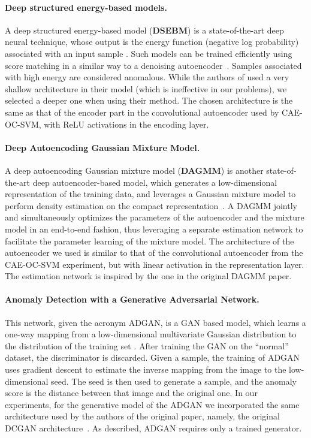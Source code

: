 \documentclass{article}
\begin{document}
	\paragraph{Deep structured energy-based models.} A deep structured energy-based model 
	(\textbf{DSEBM}) is a state-of-the-art 
	deep neural technique, whose output is the energy function	
	(negative log probability) associated with an input sample \cite{zhai2016deep}. 
	Such models can be trained efficiently using score matching in a similar way to a denoising autoencoder~\cite{vincent2011connection}. 
	Samples associated with high energy are considered anomalous. 
	While the authors of \cite{zhai2016deep} used a very shallow architecture in their model 
	(which is ineffective in our problems), we selected a deeper one when using their method. The chosen architecture is the same as that of the encoder part in the convolutional autoencoder used by CAE-OC-SVM, with ReLU activations in the encoding layer.
	
	\paragraph{Deep Autoencoding Gaussian Mixture Model.} 
	A deep autoencoding Gaussian mixture model (\textbf{DAGMM}) is another state-of-the-art deep autoencoder-based model, 
	which generates a low-dimensional representation of the training data, and leverages a Gaussian 
	mixture model to perform density estimation on the compact representation~\cite{zong2018deep}. A DAGMM jointly
	and simultaneously optimizes the parameters of the autoencoder and the mixture model 
	in an end-to-end fashion, thus leveraging a separate estimation network to facilitate the parameter learning of the mixture model. The architecture of the autoencoder we used is similar to that of the convolutional autoencoder from the CAE-OC-SVM experiment, but with linear activation in the representation layer. 
The estimation network is inspired by the one in the original DAGMM paper. 


	\paragraph{Anomaly Detection with a Generative Adversarial Network.} This network, 
	given the acronym ADGAN, is a GAN based model, which learns a one-way mapping from a low-dimensional multivariate Gaussian distribution to the distribution of the training set \cite{deecke2018anomaly}. 
	After training the GAN on the ``normal'' dataset, the discriminator is discarded. Given a sample, the training of ADGAN uses gradient descent to estimate the inverse mapping from the image to the low-dimensional seed. The seed is then used to generate a sample, and the anomaly score is the  distance between that image and the original one. In our experiments, for the generative model of the ADGAN we incorporated the same architecture used by the authors of the original paper, namely, the original DCGAN architecture~\cite{radford2015unsupervised}. As described, ADGAN requires only a trained generator. 
\end{document}
